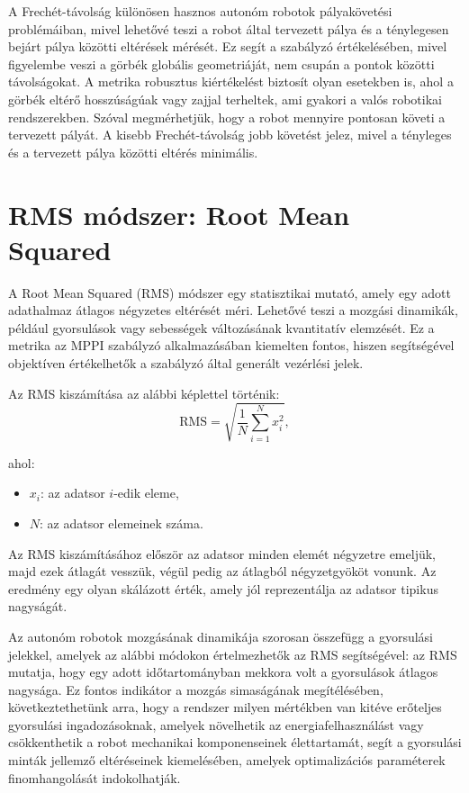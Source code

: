 A Frechét-távolság különösen hasznos autonóm robotok pályakövetési problémáiban, mivel lehetővé teszi a robot által tervezett pálya és a ténylegesen bejárt pálya közötti eltérések mérését. Ez segít a szabályzó értékelésében, mivel figyelembe veszi a görbék globális geometriáját, nem csupán a pontok közötti távolságokat. A metrika robusztus kiértékelést biztosít olyan esetekben is, ahol a görbék eltérő hosszúságúak vagy zajjal terheltek, ami gyakori a valós robotikai rendszerekben. Szóval megmérhetjük, hogy a robot mennyire pontosan követi a tervezett pályát. A kisebb Frechét-távolság jobb követést jelez, mivel a tényleges és a tervezett pálya közötti eltérés minimális.


\section{RMS módszer: Root Mean Squared}
A Root Mean Squared (RMS) módszer egy statisztikai mutató, amely egy adott adathalmaz átlagos négyzetes eltérését méri. Lehetővé teszi a mozgási dinamikák, például gyorsulások vagy sebességek változásának kvantitatív elemzését. Ez a metrika az MPPI szabályzó alkalmazásában kiemelten fontos, hiszen segítségével objektíven értékelhetők a szabályzó által generált vezérlési jelek.

Az RMS kiszámítása az alábbi képlettel történik:
\begin{equation}
    \text{RMS} = \sqrt{\frac{1}{N} \sum_{i=1}^{N} x_i^2},
\end{equation}

ahol:
\begin{itemize}
    \item \( x_i \): az adatsor \( i \)-edik eleme,
    \item \( N \): az adatsor elemeinek száma.
\end{itemize}

Az RMS kiszámításához először az adatsor minden elemét négyzetre emeljük, majd ezek átlagát vesszük, végül pedig az átlagból négyzetgyököt vonunk. Az eredmény egy olyan skálázott érték, amely jól reprezentálja az adatsor tipikus nagyságát.

Az autonóm robotok mozgásának dinamikája szorosan összefügg a gyorsulási jelekkel, amelyek az alábbi módokon értelmezhetők az RMS segítségével: az RMS mutatja, hogy egy adott időtartományban mekkora volt a gyorsulások átlagos nagysága. Ez fontos indikátor a mozgás simaságának megítélésében, következtethetünk arra, hogy a rendszer milyen mértékben van kitéve erőteljes gyorsulási ingadozásoknak, amelyek növelhetik az energiafelhasználást vagy csökkenthetik a robot mechanikai komponenseinek élettartamát, segít a gyorsulási minták jellemző eltéréseinek kiemelésében, amelyek optimalizációs paraméterek finomhangolását indokolhatják.

